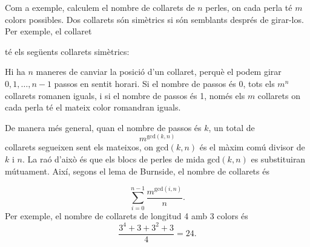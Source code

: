 Com a exemple, calculem el nombre de collarets de $n$ perles, on cada
perla té $m$ colors possibles. Dos collarets són simètrics si són
semblants després de girar-los. Per exemple, el collaret
\begin{center}
\end{center}
té els següents collarets simètrics:
\begin{center}
\end{center}
Hi ha $n$ maneres de canviar la posició d'un collaret, perquè el podem
girar $0,1,\ldots,n-1$ passos en sentit horari. Si el nombre de passos
és 0, tots els $m^n$ collarets romanen iguals, i si el nombre de
passos és 1, només els $m$ collarets on cada perla té el mateix color
romandran iguals.

De manera més general, quan el nombre de passos és $k$, un total de
\[m^{\textrm{gcd}(k,n)}\]
collarets segueixen sent els mateixos, on $\textrm{gcd}(k,n)$ és
el màxim comú divisor de $k$ i $n$. La raó d'això és que els blocs de
perles de mida $\textrm{gcd}(k,n)$ es substituiran mútuament. Així,
segons el lema de Burnside, el nombre de collarets és

\[\sum_{i=0}^{n-1} \frac{m^{\textrm{gcd}(i,n)}}{n}. \]
Per exemple, el nombre de collarets de longitud 4 amb 3 colors és
\[\frac{3^4+3+3^2+3}{4} = 24. \]


